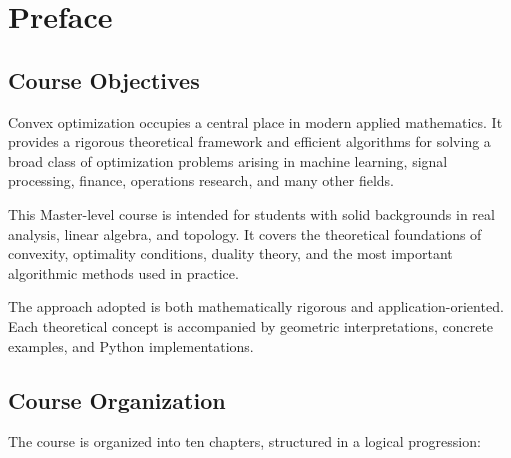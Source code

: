 \chapter*{Preface}

\section*{Course Objectives}

Convex optimization occupies a central place in modern applied mathematics.
It provides a rigorous theoretical framework and efficient algorithms for solving
a broad class of optimization problems arising in machine learning, signal processing,
finance, operations research, and many other fields.

This Master-level course is intended for students with solid backgrounds in real
analysis, linear algebra, and topology. It covers the theoretical foundations of
convexity, optimality conditions, duality theory, and the most important algorithmic
methods used in practice.

The approach adopted is both mathematically rigorous and application-oriented.
Each theoretical concept is accompanied by geometric interpretations, concrete
examples, and Python implementations.

\section*{Course Organization}

The course is organized into ten chapters, structured in a logical progression:

